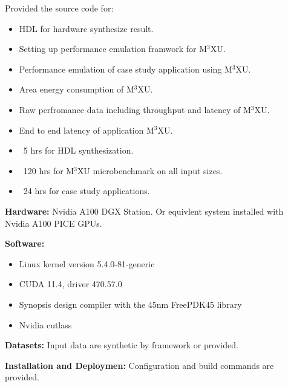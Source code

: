 \documentclass[conference]{IEEEtran}
\newcommand{\MPCMXU}[1]{M$^{3}$XU}
\begin{document}
\newartifact

\artrel
Provided the source code for:
\begin{itemize}
    \item HDL for hardware synthesize result.
    \item Setting up performance emulation framwork for \MPCMXU{}.
    \item Performance emulation of case study application using \MPCMXU{}.
\end{itemize}

\artexp
\begin{itemize}
    \item Area energy consumption of \MPCMXU{}.
    \item Raw perfromance data including throughput and latency of \MPCMXU{}.
    \item End to end latency of application \MPCMXU{}.
\end{itemize}

\arttime
\begin{itemize}
    \item ~5 hrs for HDL synthesization.
    \item ~120 hrs for \MPCMXU{} microbenchmark on all input sizes.
    \item ~24 hrs for case study applications.
\end{itemize}

\artin
\noindent\textbf{Hardware:} Nvidia A100 DGX Station. Or equivlent system installed with Nvidia A100 PICE GPUs.

\noindent\textbf{Software:}
\begin{itemize}
    \item Linux kernel version 5.4.0-81-generic
    \item CUDA 11.4, driver 470.57.0
    \item Synopsis design compiler with the 45nm FreePDK45 library
    \item Nvidia cutlass
\end{itemize}

\noindent\textbf{Datasets:} Input data are synthetic by framework or provided. 

\noindent\textbf{Installation and Deploymen:} Configuration and build commands are provided.
\end{document}

